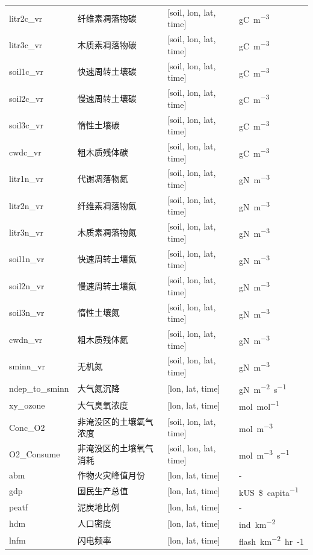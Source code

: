 \documentclass[a4paper,12pt,twoside]{article}
\begin{document}
{\begin{longtable}[htbp]{lp{}ll}
litr2c\_vr & 纤维素凋落物碳 & {[}soil, lon, lat, time{]}  & \unit{gC.m^{-3}} \\
litr3c\_vr & 木质素凋落物碳 & {[}soil, lon, lat, time{]}  & \unit{gC.m^{-3}} \\
soil1c\_vr & 快速周转土壤碳 & {[}soil, lon, lat, time{]}  & \unit{gC.m^{-3}} \\
soil2c\_vr & 慢速周转土壤碳 & {[}soil, lon, lat, time{]}  & \unit{gC.m^{-3}} \\
soil3c\_vr & 惰性土壤碳 & {[}soil, lon, lat, time{]}  & \unit{gC.m^{-3}} \\
cwdc\_vr & 粗木质残体碳 & {[}soil, lon, lat, time{]}  & \unit{gC.m^{-3}} \\
litr1n\_vr & 代谢凋落物氮 & {[}soil, lon, lat, time{]}  & \unit{gN.m^{-3}} \\
litr2n\_vr & 纤维素凋落物氮 & {[}soil, lon, lat, time{]}  & \unit{gN.m^{-3}} \\
litr3n\_vr & 木质素凋落物氮 & {[}soil, lon, lat, time{]}  & \unit{gN.m^{-3}} \\
soil1n\_vr & 快速周转土壤氮 & {[}soil, lon, lat, time{]}  & \unit{gN.m^{-3}} \\
soil2n\_vr & 慢速周转土壤氮 & {[}soil, lon, lat, time{]}  & \unit{gN.m^{-3}} \\
soil3n\_vr & 惰性土壤氮 & {[}soil, lon, lat, time{]}  & \unit{gN.m^{-3}} \\
cwdn\_vr & 粗木质残体氮 & {[}soil, lon, lat, time{]}  & \unit{gN.m^{-3}} \\
sminn\_vr & 无机氮 & {[}soil, lon, lat, time{]}  & \unit{gN.m^{-3}} \\
ndep\_to\_sminn & 大气氮沉降 & {[}lon, lat, time{]}  & \unit{gN.m^{-2}.s^{-1}} \\
xy\_ozone & 大气臭氧浓度 & {[}lon, lat, time{]}  & \unit{mol.mol^{-1}} \\
Conc\_O2 & 非淹没区的土壤氧气浓度 & {[}soil, lon, lat, time{]} & \unit{mol.m^{-3}} \\
O2\_Consume & 非淹没区的土壤氧气消耗 & {[}soil, lon, lat, time{]} & \unit{mol.m^{-3}.s^{-1}} \\
abm & 作物火灾峰值月份 & {[}lon, lat, time{]} & - \\
gdp & 国民生产总值 & {[}lon, lat, time{]} & \unit{kUS\$.capita^{-1}}\\
peatf & 泥炭地比例 & {[}lon, lat, time{]} & - \\
hdm & 人口密度 & {[}lon, lat, time{]} & \unit{ind.km^{-2}}\\
lnfm & 闪电频率 & {[}lon, lat, time{]} & \unit{flash.km^{-2}.hr{-1}} \\

\end{longtable}}
\end{document}
